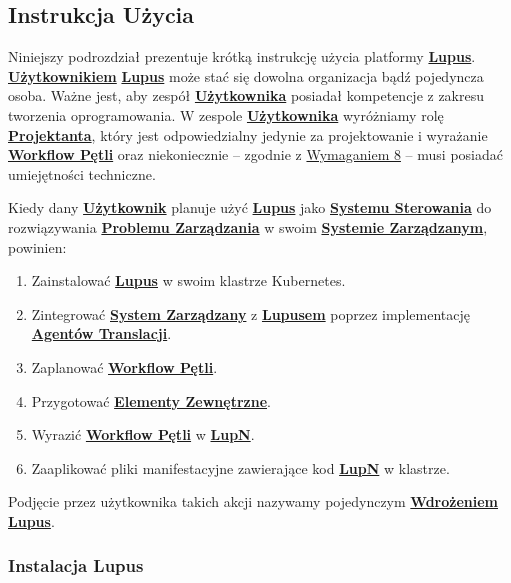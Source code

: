 \subsection{Instrukcja Użycia}

Niniejszy podrozdział prezentuje krótką instrukcję użycia platformy \hyperlink{def:lupus}{\textbf{Lupus}}. \hyperlink{def:uzytkownik}{\textbf{Użytkownikiem}} \hyperlink{def:lupus}{\textbf{Lupus}} może stać się dowolna organizacja bądź pojedyncza osoba. Ważne jest, aby zespół \hyperlink{def:uzytkownik}{\textbf{Użytkownika}} posiadał kompetencje z zakresu tworzenia oprogramowania. W zespole \hyperlink{def:uzytkownik}{\textbf{Użytkownika}} wyróżniamy rolę \hyperlink{def:projektant}{\textbf{Projektanta}}, który jest odpowiedzialny jedynie za projektowanie i wyrażanie \hyperlink{def:workflow-petli}{\textbf{Workflow Pętli}} oraz niekoniecznie – zgodnie z \hyperref[req:8]{Wymaganiem 8} – musi posiadać umiejętności techniczne. 

Kiedy dany \hyperlink{def:uzytkownik}{\textbf{Użytkownik}} planuje użyć \hyperlink{def:lupus}{\textbf{Lupus}} jako \hyperlink{def:system-sterowania}{\textbf{Systemu Sterowania}} do rozwiązywania \hyperlink{def:problem-zarzadzania}{\textbf{Problemu Zarządzania}} w swoim \hyperlink{def:system-zarzadzany}{\textbf{Systemie Zarządzanym}}, powinien:
\begin{enumerate}
    \item Zainstalować \hyperlink{def:lupus}{\textbf{Lupus}} w swoim klastrze Kubernetes.
    \item Zintegrować \hyperlink{def:system-zarzadzany}{\textbf{System Zarządzany}} z \hyperlink{def:lupus}{\textbf{Lupusem}} poprzez implementację \hyperlink{def:agent-translacji}{\textbf{Agentów Translacji}}.
    \item Zaplanować \hyperlink{def:workflow-petli}{\textbf{Workflow Pętli}}.
    \item Przygotować \hyperlink{def:element-zewnetrzny}{\textbf{Elementy Zewnętrzne}}.
    \item Wyrazić \hyperlink{def:workflow-petli}{\textbf{Workflow Pętli}} w \hyperlink{def:lupn}{\textbf{LupN}}.
    \item Zaaplikować pliki manifestacyjne zawierające kod \hyperlink{def:lupn}{\textbf{LupN}} w klastrze.
\end{enumerate}

Podjęcie przez użytkownika takich akcji nazywamy pojedynczym \hyperlink{def:wdrozenie-lupus}{\textbf{Wdrożeniem Lupus}}.

\subsubsection{Instalacja Lupus}

